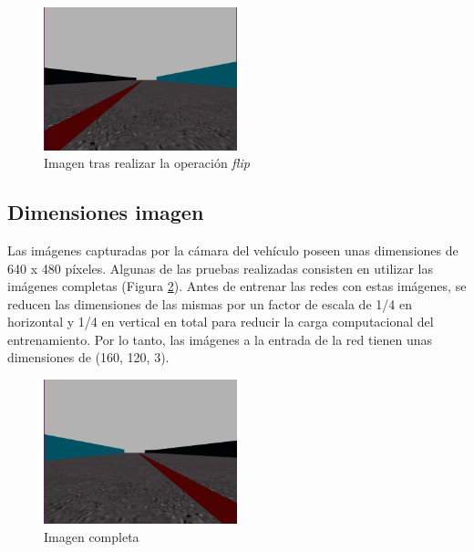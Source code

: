 \begin{figure}
\begin{center}
	\includegraphics[width=0.5\textwidth]{figures/Regresion/img_flip.png}
   \caption{Imagen tras realizar la operación \textit{flip}}
	\label{fig.image_flip}
\end{center}
\end{figure}


\subsection{Dimensiones imagen}

Las imágenes capturadas por la cámara del vehículo poseen unas dimensiones de 640 x 480 píxeles. Algunas de las pruebas realizadas consisten en utilizar las imágenes completas (Figura \ref{fig.completa_reg}). Antes de entrenar las redes con estas imágenes, se reducen las dimensiones de las mismas por un factor de escala de 1/4 en horizontal y 1/4 en vertical en total para reducir la carga computacional del entrenamiento. Por lo tanto, las imágenes a la entrada de la red tienen unas dimensiones de (160, 120, 3).\\

\begin{figure}
\begin{center}
	\includegraphics[width=0.5\textwidth]{figures/Regresion/img_normal.png}
   \caption{Imagen completa}
	\label{fig.completa_reg}
\end{center}
\end{figure}

